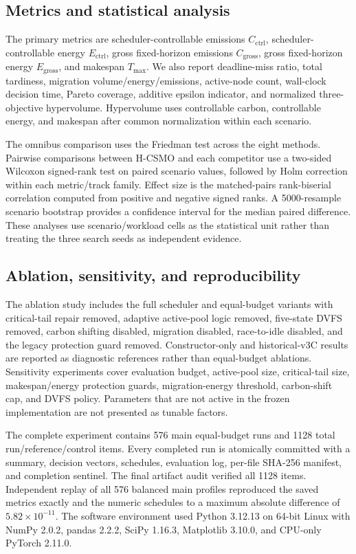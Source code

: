\documentclass[preprint,12pt]{elsarticle}
\newcommand{\method}{H-CSMO\xspace}
\begin{document}
\subsection{Metrics and statistical analysis}

The primary metrics are scheduler-controllable emissions $C_{\mathrm{ctrl}}$, scheduler-controllable energy $E_{\mathrm{ctrl}}$, gross fixed-horizon emissions $C_{\mathrm{gross}}$, gross fixed-horizon energy $E_{\mathrm{gross}}$, and makespan $T_{\max}$. We also report deadline-miss ratio, total tardiness, migration volume/energy/emissions, active-node count, wall-clock decision time, Pareto coverage, additive epsilon indicator, and normalized three-objective hypervolume. Hypervolume uses controllable carbon, controllable energy, and makespan after common normalization within each scenario.

The omnibus comparison uses the Friedman test across the eight methods. Pairwise comparisons between \method and each competitor use a two-sided Wilcoxon signed-rank test on paired scenario values, followed by Holm correction within each metric/track family. Effect size is the matched-pairs rank-biserial correlation computed from positive and negative signed ranks. A 5000-resample scenario bootstrap provides a confidence interval for the median paired difference. These analyses use scenario/workload cells as the statistical unit rather than treating the three search seeds as independent evidence.

\subsection{Ablation, sensitivity, and reproducibility}

The ablation study includes the full scheduler and equal-budget variants with critical-tail repair removed, adaptive active-pool logic removed, five-state DVFS removed, carbon shifting disabled, migration disabled, race-to-idle disabled, and the legacy protection guard removed. Constructor-only and historical-v3C results are reported as diagnostic references rather than equal-budget ablations. Sensitivity experiments cover evaluation budget, active-pool size, critical-tail size, makespan/energy protection guards, migration-energy threshold, carbon-shift cap, and DVFS policy. Parameters that are not active in the frozen implementation are not presented as tunable factors.

The complete experiment contains 576 main equal-budget runs and 1128 total run/reference/control items. Every completed run is atomically committed with a summary, decision vectors, schedules, evaluation log, per-file SHA-256 manifest, and completion sentinel. The final artifact audit verified all 1128 items. Independent replay of all 576 balanced main profiles reproduced the saved metrics exactly and the numeric schedules to a maximum absolute difference of $5.82\times10^{-11}$. The software environment used Python 3.12.13 on 64-bit Linux with NumPy 2.0.2, pandas 2.2.2, SciPy 1.16.3, Matplotlib 3.10.0, and CPU-only PyTorch 2.11.0.
\end{document}
